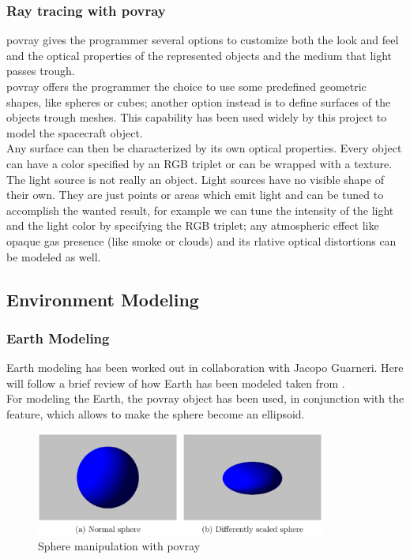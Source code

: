 \subsubsection{Ray tracing with \acrshort{povray}}
\acrshort{povray} gives the programmer several options to customize both the look and feel and the optical properties of the represented objects and the medium that light passes trough.\\
\acrshort{povray} offers the programmer the choice to use some predefined geometric shapes, like spheres or cubes; another option instead is to define surfaces of the objects trough meshes. This capability has been used widely by this project to model the spacecraft object.\\
Any surface can then be characterized by its own optical properties. Every object can have a color specified by an RGB triplet or can be wrapped with a texture.\\
The light source is not really an object. Light sources have no visible shape of their own. They are just points or areas which emit light and can be tuned to accomplish the wanted result, for example we can tune the intensity of the light and the light color by specifying the RGB triplet; any atmospheric effect like opaque gas presence (like smoke or clouds) and its rlative optical distortions can be modeled as well.\\

\subsection{Environment Modeling}
\subsubsection{Earth Modeling}
Earth modeling has been worked out in collaboration with Jacopo Guarneri.
Here will follow a brief review of how Earth has been modeled taken from \cite{jacopo}.\\
For modeling the Earth, the \acrshort{povray}  object has been used, in conjunction with the  feature, which allows to make the sphere become an ellipsoid.

\begin{figure}[H]
\centering
\includegraphics[width=0.85\textwidth]{gfx/sphere_scaling.eps}
\caption{Sphere manipulation with \acrshort{povray} \cite{jacopo}}
\label{fig:spherescaling}
\end{figure}

